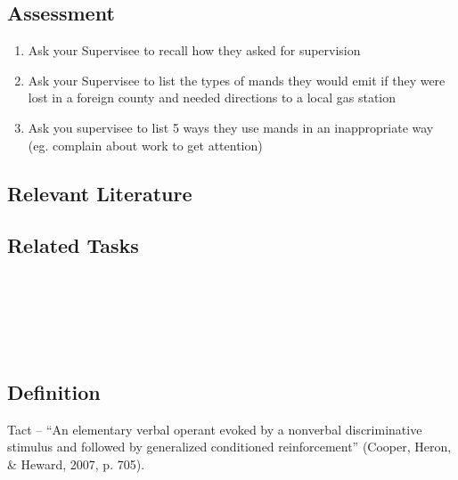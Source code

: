 \subsection{Assessment}
\begin{enumerate}
\item Ask your Supervisee to recall how they asked for supervision
\item Ask your Supervisee to list the types of mands they would emit if they were lost in a foreign county and needed directions to a local gas station
\item Ask you supervisee to list 5 ways they use mands in an inappropriate way (eg. complain about work to get attention)
%
\end{enumerate}
%
\subsection{Relevant Literature}
\begin{refsection}
\nocite{cooper2007applied,
        laraway2003motivating,
        michael1988establishing,
        sundberg2001benefits,
        sweeney2007transferring}
\printbibliography[heading=none]
\end{refsection}
%
\subsection{Related Tasks}
\fourdNine{}\\
\fourdEleven{}\\
\fourFKTwentySeven{}\\
\fourFKTwentyEight{}\\
%
\clearpage \section{\fourFKFourtyFive{}}
\subsection{Definition}
Tact – ``An elementary verbal operant evoked by a nonverbal discriminative stimulus and followed by generalized conditioned reinforcement'' (Cooper, Heron, \& Heward, 2007, p. 705).
%
